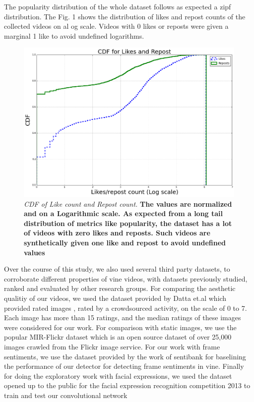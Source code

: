 The popularity distribution of the whole dataset follows as expected a zipf distribution. The Fig. 1 shows the distribution of likes and repost counts of the collected videos on al og scale. Videos with 0 likes or reposts were given a marginal 1 like to avoid undefined logarithms. 

\begin{figure}[!htb]
\centering
\includegraphics[width=\columnwidth]{plots/CDF_Like_reposts}
\caption{\textsl{ CDF of Like count and Repost count.} \textbf{The values are normalized and on a Logarithmic scale. As expected from a long tail distribution of metrics like popularity, the dataset has a lot of videos with zero likes and reposts. Such videos are synthetically given one like and repost to avoid undefined values}}
\label{fig:CDF_posts}
\end{figure}

Over the course of this study, we also used several third party datasets, to corroborate different properties of vine videos, with datasets previously studied, ranked and evaluated by other research groups. For comparing the aesthetic qualitiy of our videos, we used the dataset provided by Datta et.al \cite{datta2008algorithmic} which provided rated images , rated by a crowdsourced activity, on the scale of 0 to 7. Each image has more than 15 ratings, and the median ratings of these images were considered for our work. 
For comparison with static images, we use the popular MIR-Flickr dataset \cite{huiskes08} which is an open source dataset of over 25,000 images crawled from the Flickr image service. 
For our work with frame sentiments, we use the dataset provided by the work of sentibank \cite{jou2015visual} \cite{SentiBank} for baselining the performance of our detector for detecting frame sentiments in vine. Finally for doing the exploratory work with facial expressions, we used the dataset opened up to the public for the facial expression recognition competition 2013 \cite{goodfellow2013challenges} to train and test our convolutional network


